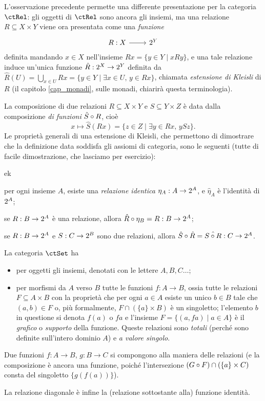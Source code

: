 \begin{remark}\label{diff_pres_cat_rel}
	L'osservazione precedente permette una differente presentazione per la categoria \(\ctRel\): gli oggetti di \(\ctRel\) sono ancora gli insiemi, ma una relazione \(R\subseteq X\times Y\) viene ora presentata come una \emph{funzione}
	\[\dmFun RX{\pow Y}\]
	definita mandando \(x\in X\) nell'insieme \(Rx = \{y\in Y\mid xRy\}\), e una tale relazione induce un'unica funzione \(\hat R : 2^{X}\to 2^{Y}\) definita da \(\hat R(U) = \bigcup_{x\in U}Rx = \{y\in Y\mid \exists x\in U,\, y\in Rx\}\), chiamata \emph{estensione di Kleisli} di \(R\) (il capitolo \ref{cap_monadi}, sulle monadi, chiarirà questa terminologia).

	La composizione di due relazioni \(R\subseteq X\times Y\) e \(S\subseteq Y\times Z\) è data dalla composizione \emph{di funzioni} \(\hat S\circ R\), cioè
	\[
		x \mapsto \hat S(Rx) = \{z\in Z\mid \exists y\in Rx,\, ySz\}.
	\]
	Le proprietà generali di una estensione di Kleisli, che permettono di dimostrare che la definizione data soddisfa gli assiomi di categoria, sono le seguenti (tutte di facile dimostrazione, che lasciamo per esercizio):
	\begin{enumtag}{ek}
		\item \label{ek_1} per ogni insieme \(A\), esiste una \emph{relazione identica} \(\eta_A : A\to 2^{A}\), e \(\hat\eta_A\) è l'identità di \(2^{A}\);
		\item \label{ek_2} se \(R : B\to 2^{A}\) è una relazione, allora \(\hat R\circ \eta_B = R : B \to2^{A}\);
		\item \label{ek_3} se \(R : B\to 2^{A}\) e \(S : C\to 2^{B}\) sono due relazioni, allora \(\hat S\circ \hat R = \hat{S\circ R} : C\to 2^{A}\).
	\end{enumtag}
\end{remark}
\begin{example}\label{ex_cat_insiemi}
	La categoria \(\ctSet\) ha
	\begin{itemize}
		\item per oggetti gli insiemi, denotati con le lettere \(A,B,C\dots\);
		\item per morfismi da \(A\) verso \(B\) tutte le funzioni \(f : A\to B\), ossia tutte le relazioni \(F\subseteq A\times B\) con la proprietà che per ogni \(a\in A\) esiste un unico \(b\in B\) tale che \((a,b)\in F\) o, più formalmente, \(F\cap(\{a\}\times B)\) è un singoletto; l'elemento \(b\) in questione si denota \(f(a)\) o \(fa\) e l'insieme \(F = \{(a,fa)\mid a\in A\}\) è il \emph{grafico} o \emph{supporto} della funzione. Queste relazioni sono \emph{totali} (perché sono definite sull'intero dominio \(A\)) e \emph{a valore singolo}.
	\end{itemize}
	Due funzioni \(f : A\to B\), \(g : B\to C\) si compongono alla maniera delle relazioni (e la composizione è ancora una funzione, poiché l'intersezione \((G\circ F)\cap (\{a\}\times C)\) consta del singoletto \(\{g(f(a))\}\)).

	La relazione diagonale è infine la (relazione sottostante alla) funzione identità.
\end{example}
